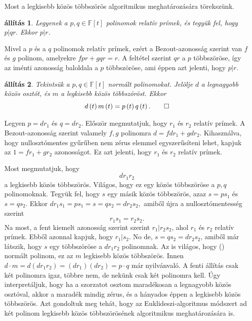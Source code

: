 \documentclass[a4paper, showtrims]{memoir}
\makeatletter
\renewenvironment{proof}[1][\proofname]
    {\par\pushQED{\qed}%
    \normalfont \topsep6\p@\@plus6\p@\relax
    \trivlist
    \item[\hskip\labelsep
        \itshape
    #1\@addpunct{:}]\ignorespaces}
    {\popQED\endtrivlist\@endpefalse}
\theoremstyle{plain}
\newtheorem{proposition}{állítás}[chapter]
\theoremstyle{remark}
\theoremstyle{definition}
\makeatother
\begin{document}
Most a legkisebb közös többszörös algoritmikus meghatározására törekszünk.
\begin{proposition}\label{pr:rprim}
	Legyenek a $p,q\in\mathbb{F}\left[ t \right]$ polinomok relatív prímek,
	és tegyük fel, hogy
	\begin{math}
		p|qr.
	\end{math}
	Ekkor $p|r$.
\end{proposition}
\begin{proof}
	Mivel a $p$ és a $q$ polinomok relatív prímek,
	ezért a Bezout-azonosság szerint van $f$ és $g$ polinom, amelyekre
	\(
	fpr+gqr=r.
	\)
	A feltétel szerint $qr$ a $p$ többszöröse,
	így az iménti azonosság baloldala a $p$ többszöröse,
	ami éppen azt jelenti, hogy $p|r$.
\end{proof}
\begin{proposition}
	Tekintsük a $p,q\in\mathbb{F}\left[ t \right]$ normált polinomokat.
	Jelölje $d$ a legnagyobb közös osztót,
	és
	$m$ a legkisebb közös többszöröst.
	Ekkor
	\begin{displaymath}
		d\left( t \right)m\left( t \right)=p\left( t \right)q\left( t \right).\qedhere
	\end{displaymath}
\end{proposition}
\begin{proof}
	Legyen $p=dr_1$ és $q=dr_2$.
	Először megmutatjuk, hogy $r_1$ és $r_2$ relatív prímek.
	A Bezout-azonosság szerint valamely $f,g$ polinomra
	\(
	d=fdr_1+gdr_2.
	\)
	Kihasználva, hogy nullosztómentes gyűrűben nem zérus elemmel egyszerűsíteni lehet,
	kapjuk az
	\(
	1=fr_1+gr_2
	\)
	azonosságot.
	Ez azt jelenti, hogy $r_1$ és $r_2$ relatív prímek.

	Most megmutatjuk, hogy
	\[
		dr_1r_2\tag{\dag}
	\]
	a legkisebb közös többszörös.
	Világos, hogy ez egy közös többszöröse a $p,q$ polinomoknak.
	Tegyük fel, hogy $s$ egy másik közös többszörös, azaz
	$s=ps_1$ és $s=qs_2$.
	Ekkor
	\begin{math}
		dr_1s_1=ps_1=s=qs_2=dr_2s_2,
	\end{math}
	amiből újra a nullosztómentesség szerint
	\[
		r_1s_1=r_2s_2.
	\]
	Na most,
	a fent kiemelt azonosság szerint szerint $r_1|r_2s_2$, ahol $r_1$ és $r_2$ relatív prímek.
	Ebből azonnal kapjuk, hogy $r_1|s_2$.
	No de, $s=qs_2=dr_2s_2$, amiből már látszik,
	hogy $s$ egy többszöröse a $dr_1r_2$ polinomnak.
	Az is világos, hogy (\dag) normált polinom, ez az $m$ legkisebb közös többszörös.
	Innen
	$d\cdot m=d(dr_1r_2)=(dr_1)(dr_2)=p\cdot q$ már nyilvánvaló.
\end{proof}
A fenti állítás csak két polinomra igaz, többre nem,
de nekünk csak két polinomra kell.
Úgy interpretáljuk,
hogy ha a szorzatot osztom maradékosan a legnagyobb közös osztóval, akkor a maradék mindig
zérus,
és a hányados éppen a legkisebb közös többszörös.
Azt gondoltuk meg tehát,
hogy az Euklideszi-algoritmus módszert ad két polinom legkisebb közös többszörösének algoritmikus meghatározására is.
\end{document}
